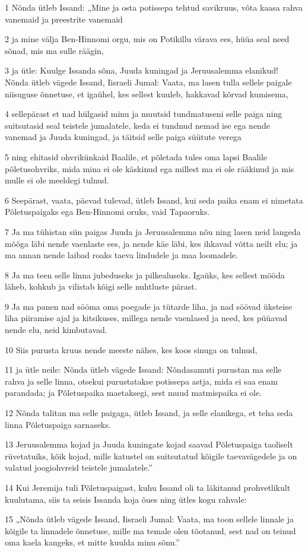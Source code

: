 \par 1 Nõnda ütleb Issand: „Mine ja osta potissepa tehtud savikruus, võta kaasa rahva vanemaid ja preestrite vanemaid
\par 2 ja mine välja Ben-Hinnomi orgu, mis on Potikillu värava ees, hüüa seal need sõnad, mis ma sulle räägin,
\par 3 ja ütle: Kuulge Issanda sõna, Juuda kuningad ja Jeruusalemma elanikud! Nõnda ütleb vägede Issand, Iisraeli Jumal: Vaata, ma lasen tulla sellele paigale niisuguse õnnetuse, et igaühel, kes sellest kuuleb, hakkavad kõrvad kumisema,
\par 4 sellepärast et nad hülgasid minu ja muutsid tundmatuseni selle paiga ning suitsutasid seal teistele jumalatele, keda ei tundnud nemad ise ega nende vanemad ja Juuda kuningad, ja täitsid selle paiga süütute verega
\par 5 ning ehitasid ohvrikünkaid Baalile, et põletada tules oma lapsi Baalile põletusohvriks, mida mina ei ole käskinud ega millest ma ei ole rääkinud ja mis mulle ei ole meeldegi tulnud.
\par 6 Seepärast, vaata, päevad tulevad, ütleb Issand, kui seda paika enam ei nimetata Põletuspaigaks ega Ben-Hinnomi oruks, vaid Tapaoruks.
\par 7 Ja ma tühistan siin paigas Juuda ja Jeruusalemma nõu ning lasen neid langeda mõõga läbi nende vaenlaste ees, ja nende käe läbi, kes ihkavad võtta neilt elu; ja ma annan nende laibad roaks taeva lindudele ja maa loomadele.
\par 8 Ja ma teen selle linna jubeduseks ja pilkealuseks. Igaüks, kes sellest mööda läheb, kohkub ja vilistab kõigi selle nuhtluste pärast.
\par 9 Ja ma panen nad sööma oma poegade ja tütarde liha, ja nad söövad üksteise liha piiramise ajal ja kitsikuses, millega nende vaenlased ja need, kes püüavad nende elu, neid kimbutavad.
\par 10 Siis purusta kruus nende meeste nähes, kes koos sinuga on tulnud,
\par 11 ja ütle neile: Nõnda ütleb vägede Issand: Nõndasamuti purustan ma selle rahva ja selle linna, otsekui purustatakse potissepa astja, mida ei saa enam parandada; ja Põletuspaika maetaksegi, sest muud matmispaika ei ole.
\par 12 Nõnda talitan ma selle paigaga, ütleb Issand, ja selle elanikega, et teha seda linna Põletuspaiga sarnaseks.
\par 13 Jeruusalemma kojad ja Juuda kuningate kojad saavad Põletuspaiga taoliselt rüvetatuiks, kõik kojad, mille katustel on suitsutatud kõigile taevavägedele ja on valatud joogiohvreid teistele jumalatele.”
\par 14 Kui Jeremija tuli Põletuspaigast, kuhu Issand oli ta läkitanud prohvetlikult kuulutama, siis ta seisis Issanda koja õues ning ütles kogu rahvale:
\par 15 „Nõnda ütleb vägede Issand, Iisraeli Jumal: Vaata, ma toon sellele linnale ja kõigile ta linnadele õnnetuse, mille ma temale olen tõotanud, sest nad on teinud oma kaela kangeks, et mitte kuulda minu sõnu.”

